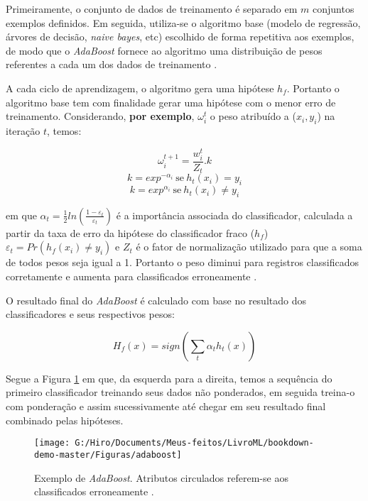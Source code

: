 \documentclass[
  openany]{book}
\begin{document}
Primeiramente, o conjunto de dados de treinamento é separado em \(m\) conjuntos exemplos definidos. Em seguida, utiliza-se o algoritmo base (modelo de regressão, árvores de decisão, \emph{naive bayes}, etc) escolhido de forma repetitiva aos exemplos, de modo que o \emph{AdaBoost} fornece ao algoritmo uma distribuição de pesos referentes a cada um dos dados de treinamento \citep{chaves2012estudo}.

A cada ciclo de aprendizagem, o algoritmo gera uma hipótese \(h_f\). Portanto o algoritmo base tem com finalidade gerar uma hipótese com o menor erro de treinamento. Considerando, \textbf{por exemplo}, \(\omega_i^{t}\) o peso atribuído a (\(x_i,y_i\)) na iteração \(t\), temos:

\begin{equation}
    \omega_i^{t+1}=\frac{w_i^{t}}{Z_t}.k 
    \label{eq:pesoadaboost}
\end{equation}
\[k=exp^{-\alpha_i} \ \mbox{se} \ h_t(x_i)=y_i\]
\[k=exp^{\alpha_i}\ \mbox{se} \ h_t(x_i)\neq y_i\]

em que \(\alpha_t=\frac{1}{2}ln(\frac{1-\varepsilon_t}{\varepsilon_t})\) é a importância associada do classificador, calculada a partir da taxa de erro da hipótese do classificador fraco (\(h_f\)) \(\varepsilon_t=Pr(h_f(x_i)\neq y_i)\) e \(Z_t\) é o fator de normalização utilizado para que a soma de todos pesos seja igual a 1. Portanto o peso diminui para registros classificados corretamente e aumenta para classificados erroneamente \citep{merjildo2013algoritmo, chaves2012estudo}.

O resultado final do \emph{AdaBoost} é calculado com base no resultado dos classificadores e seus respectivos pesos:

\begin{equation}
   H_f(x)=sign(\sum_t \alpha_t h_t(x)) 
    \label{eq:adaboost}
\end{equation}

Segue a Figura \ref{fig:adaboost} em que, da esquerda para a direita, temos a sequência do primeiro classificador treinando seus dados não ponderados, em seguida treina-o com ponderação e assim sucessivamente até chegar em seu resultado final combinado pelas hipóteses.

\begin{figure}

{\centering \texttt{[image: G:/Hiro/Documents/Meus-feitos/LivroML/bookdown-demo-master/Figuras/adaboost]} 

}

\caption{Exemplo de \emph{AdaBoost}. Atributos circulados referem-se aos classificados erroneamente \citep{marsh2016multivariate}.}\label{fig:adaboost}
\end{figure}
\end{document}
